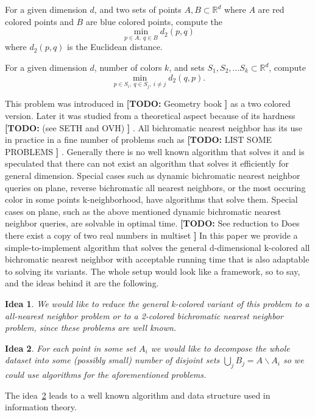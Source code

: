 \documentclass[a4paper,UKenglish,cleveref, autoref, thm-restate]{lipics-v2021}
\newcommand{\nota}[3]{{%
		\color{#2}
		\marginpar{\color{#2!75!black}\textbf\texttimes}%
		\textsf{\textbf{[\textbullet#1:}
			\textsf{\small#3}
			\textbf{\textbullet]}}%
}}
\newcommand{\todo}[1]{\nota{TODO}{red!55!black}{#1}}
\newtheorem{idea}{Idea}
\begin{document}
\begin{definition}
For a given dimension $d$, and two sets of points $A, B \subset \mathbb{R}^d$ where $A$ are red colored points and $B$ are blue colored points, compute the
$$ \min \limits_{p \in A,\ q\in B} d_2(p, q) $$
where $d_2(p, q)$ is the Euclidean distance.
\end{definition}

\begin{definition}
For a given dimension $d$, number of colors $k$, and sets $S_1, S_2, \dots S_k \subset \mathbb{R}^d$,
compute
$$ \min \limits_{p \in S_i,\ q \in S_j,\ i \neq j} d_2(q, p). $$

\end{definition}

This problem was introduced in \todo{Geometry book} as a two colored version.
Later it was studied from a theoretical aspect because of its hardness \todo{(see SETH and OVH)}.
All bichromatic nearest neighbor has its use in practice in a fine number of problems such as \todo{LIST SOME PROBLEMS}.
Generally there is no well known algorithm that solves it and is speculated that there can not exist an algorithm that solves it efficiently for general dimension.
Special cases such as dynamic bichromatic nearest neighbor queries on plane, reverse bichromatic all nearest neighbors, or the most occuring color in some points k-neighborhood, have algorithms that solve them.
Special cases on plane, such as the above mentioned dynamic bichromatic nearest neighbor queries, are solvable in optimal time. \todo{See reduction to Does there exist a copy of two real numbers in multiset}
In this paper we provide a simple-to-implement algorithm that solves the general d-dimensional k-colored all bichromatic nearest neighbor with acceptable running time that is also adaptable to solving its variants.
The whole setup would look like a framework, so to say, and the ideas behind it are the following.
\begin{idea} We would like to reduce the general k-colored variant of this problem to a all-nearest neighbor problem or to a 2-colored bichromatic nearest neighbor problem, since these problems are well known.
\end{idea}
\begin{idea}\label{idea:bigcup} For each point in some set $A_i$ we would like to decompose the whole dataset into some (possibly small) number of disjoint sets $\bigcup\limits_j B_j = A \backslash A_i$ so we could use algorithms for the aforementioned problems.
\end{idea}
The idea~\ref{idea:bigcup} leads to a well known algorithm and data structure used in information theory.
\end{document}
